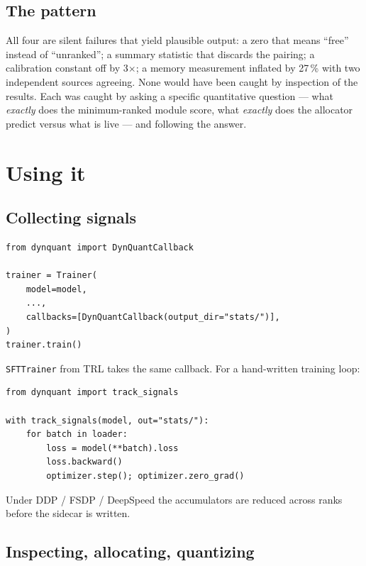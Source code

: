 \documentclass[11pt]{article}
\newcommand{\x}{$\times$}
\newcommand{\pct}{\,\%}
\newcommand{\code}[1]{\texttt{#1}}
\begin{document}
\subsection{The pattern}

All four are silent failures that yield plausible output: a zero that means ``free'' instead of
``unranked''; a summary statistic that discards the pairing; a calibration constant off by 3\x;
a memory measurement inflated by 27\pct{} with two independent sources agreeing. None would have
been caught by inspection of the results. Each was caught by asking a specific quantitative
question --- what \emph{exactly} does the minimum-ranked module score, what \emph{exactly} does
the allocator predict versus what is live --- and following the answer.

\section{Using it}

\subsection{Collecting signals}

\begin{verbatim}
from dynquant import DynQuantCallback

trainer = Trainer(
    model=model,
    ...,
    callbacks=[DynQuantCallback(output_dir="stats/")],
)
trainer.train()
\end{verbatim}

\code{SFTTrainer} from TRL takes the same callback. For a hand-written training loop:

\begin{verbatim}
from dynquant import track_signals

with track_signals(model, out="stats/"):
    for batch in loader:
        loss = model(**batch).loss
        loss.backward()
        optimizer.step(); optimizer.zero_grad()
\end{verbatim}

Under DDP / FSDP / DeepSpeed the accumulators are reduced across ranks before the sidecar is
written.

\subsection{Inspecting, allocating, quantizing}
\end{document}
